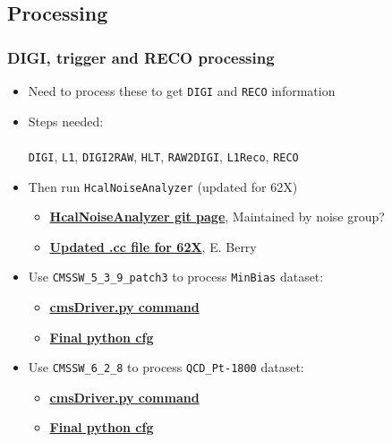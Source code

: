 \documentclass[bigger]{beamer}
\providecommand{\alert}[1]{\textbf{#1}}
\begin{document}
\subsection{Processing}
\label{sec-2-2}
\begin{frame}
\frametitle{DIGI, trigger and RECO processing}
\label{sec-2-2-1}
\begin{itemize}

\item Need to process these to get \texttt{DIGI} and \texttt{RECO} information
\label{sec-2-2-1-1}%

\item Steps needed: \\\\
\label{sec-2-2-1-2}%
\texttt{DIGI}, \texttt{L1}, \texttt{DIGI2RAW}, \texttt{HLT}, \texttt{RAW2DIGI}, \texttt{L1Reco}, \texttt{RECO}

\item Then run \texttt{HcalNoiseAnalyzer} (updated for 62X)
\label{sec-2-2-1-3}%
\begin{itemize}

\item \href{https://github.com/FHead/HcalNoiseAnalyzerCMS}{\alert{HcalNoiseAnalyzer git page}}, Maintained by noise group?
\label{sec-2-2-1-3-1}%

\item \href{http://eberry.web.cern.ch/eberry/HcalNoiseAnalyzer62X.cc.txt}{\alert{Updated .cc file for 62X}}, E. Berry
\label{sec-2-2-1-3-2}%
\end{itemize} %

\item Use \texttt{CMSSW\_5\_3\_9\_patch3} to process \texttt{MinBias} dataset:
\label{sec-2-2-1-4}%
\begin{itemize}

\item \href{https://raw.githubusercontent.com/edmundaberry/HcalReco/master/test/hcalNoise\_fromGEN-SIM\_cmsDriver.sh}{\alert{cmsDriver.py command}}
\label{sec-2-2-1-4-1}%

\item \href{https://raw.githubusercontent.com/edmundaberry/HcalReco/master/test/hcalNoise\_fromGEN-SIM\_cfg.py}{\alert{Final python cfg}}
\label{sec-2-2-1-4-2}%
\end{itemize} %

\item Use \texttt{CMSSW\_6\_2\_8} to process \texttt{QCD\_Pt-1800} dataset:
\label{sec-2-2-1-5}%
\begin{itemize}

\item \href{https://raw.githubusercontent.com/edmundaberry/HcalReco/master/test/hcalNoise_fromGEN-SIM_62X_cmsDriver.sh}{\alert{cmsDriver.py command}}
\label{sec-2-2-1-5-1}%

\item \href{https://raw.githubusercontent.com/edmundaberry/HcalReco/master/test/hcalNoise\_fromGEN-SIM\_62X\_cfg.py}{\alert{Final python cfg}}
\label{sec-2-2-1-5-2}%
\end{itemize} %
\end{itemize} %
\end{frame}
\end{document}
